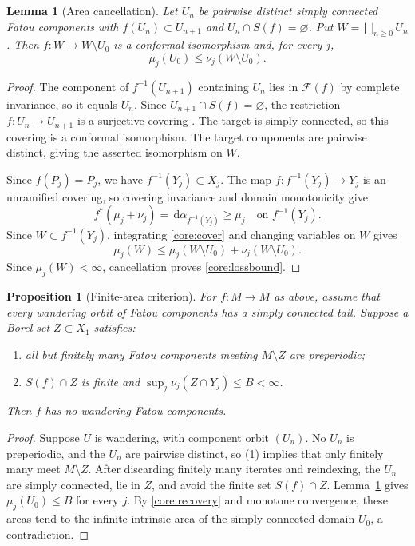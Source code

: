 \documentclass[10pt,a4paper]{amsart}
\newcommand{\Fat}{\mathcal F}
\newcommand{\dd}{\,\mathrm d}
\newtheorem{proposition}[theorem]{Proposition}
\newtheorem{lemma}[theorem]{Lemma}
\numberwithin{equation}{section}
\begin{document}
\begin{lemma}[Area cancellation]\label{core:tail}
Let $U_n$ be pairwise distinct simply connected Fatou components with
$f(U_n)\subset U_{n+1}$ and $U_n\cap S(f)=\varnothing$.
Put $W=\bigsqcup_{n\ge0}U_n$. Then $f:W\to W\setminus U_0$ is a
conformal isomorphism and, for every $j$,
\begin{equation}\label{core:lossbound}
 \mu_j(U_0)\le\nu_j(W\setminus U_0).
\end{equation}
\end{lemma}
\begin{proof}
The component of $f^{-1}(U_{n+1})$ containing $U_n$ lies in $\Fat(f)$
by complete invariance, so it equals $U_n$. Since
$U_{n+1}\cap S(f)=\varnothing$, the restriction $f:U_n\to U_{n+1}$
is a surjective covering \cite[Section~3.2]{Sixsmith}.
The target is simply connected, so this covering is a conformal
isomorphism. The target components are pairwise distinct, giving the
asserted isomorphism on $W$.

Since $f(P_j)=P_j$, we have $f^{-1}(Y_j)\subset X_j$.
The map $f:f^{-1}(Y_j)\to Y_j$ is an unramified covering, so
covering invariance and domain monotonicity give
\begin{equation}\label{core:cover}
 f^*(\mu_j+\nu_j)=\dd\alpha_{f^{-1}(Y_j)}\ge\mu_j
 \quad\text{on }f^{-1}(Y_j).
\end{equation}
Since $W\subset f^{-1}(Y_j)$, integrating \eqref{core:cover} and
changing variables on $W$ gives
\[
 \mu_j(W)\le\mu_j(W\setminus U_0)+\nu_j(W\setminus U_0).
\]
Since $\mu_j(W)<\infty$, cancellation proves \eqref{core:lossbound}.
\end{proof}

\begin{proposition}[Finite-area criterion]\label{core:global}
For $f:M\to M$ as above, assume that every wandering orbit of Fatou
components has a simply connected tail. Suppose a Borel set
$Z\subset X_1$ satisfies:
\begin{enumerate}
 \item all but finitely many Fatou components meeting $M\setminus Z$
 are preperiodic;
 \item $S(f)\cap Z$ is finite and
 $\sup_j\nu_j(Z\cap Y_j)\le B<\infty$.
\end{enumerate}
Then $f$ has no wandering Fatou components.
\end{proposition}
\begin{proof}
Suppose $U$ is wandering, with component orbit $(U_n)$.
No $U_n$ is preperiodic, and the $U_n$ are pairwise distinct, so (1)
implies that only finitely many meet $M\setminus Z$.
After discarding finitely many iterates and reindexing, the $U_n$ are
simply connected, lie in $Z$, and avoid the finite set $S(f)\cap Z$.
Lemma~\ref{core:tail} gives $\mu_j(U_0)\le B$ for every $j$.
By \eqref{core:recovery} and monotone convergence, these areas tend
to the infinite intrinsic area of the simply connected domain $U_0$,
a contradiction.
\end{proof}
\end{document}
